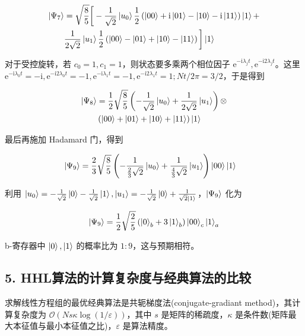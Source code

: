 \documentclass[aps,prl,twocolumn,groupedaddress]{revtex4-2}
\begin{document}
$$
\begin{aligned}
\ket{\Psi_7}
&=\sqrt{\frac{8 }{5 } }\bigg[-\frac{1 }{\sqrt{2} } \ket{u_0}\frac{1 }{2 } \left(\ket{00}+\mathrm{i}\ket{01}-\ket{10}-\mathrm{i}\ket{11} \right)\ket{1} + \\
&\frac{1 }{2\sqrt{2} } \ket{u_1}\frac{1 }{2 } \left(\ket{00}-\ket{01}+\ket{10}-\ket{11} \right) \bigg]\ket{1}
\end{aligned}
$$

对于受控旋转，若 $c_0=1,c_1=1$，则状态要多乘两个相位因子 $\mathrm{e}^{-\mathrm{i}\lambda_j t},\mathrm{e}^{-\mathrm{i}2\lambda_j t}$。这里 $\mathrm{e}^{-\mathrm{i}\lambda_0 t}=-\mathrm{i},\mathrm{e}^{-\mathrm{i}2\lambda_0 t}=-1,\mathrm{e}^{-\mathrm{i}\lambda_1 t}=-1,\mathrm{e}^{-\mathrm{i}2\lambda_1 t}=1;Nt/2\pi=3/2$，于是得到

$$
\begin{aligned}
\ket{\Psi_8}
&=\frac{1 }{2 } \sqrt{\frac{8 }{5 } }\left(-\frac{1 }{\sqrt{2} } \ket{u_0} + \frac{1 }{2\sqrt{2} } \ket{u_1} \right)\otimes \\
&\left(\ket{00}+\ket{01}+\ket{10}+\ket{11} \right)\ket{1}
\end{aligned}
$$

最后再施加 Hadamard 门，得到

$$
\begin{aligned}
\ket{\Psi_9}
&=\frac{2 }{3 } \sqrt{\frac{8 }{5 } }\left(-\frac{1 }{\frac{2 }{3 } \sqrt{2} } \ket{u_0} + \frac{1 }{\frac{4 }{3 } \sqrt{2} } \ket{u_1} \right)\ket{00}\ket{1}
\end{aligned}
$$

利用 $\ket{u_0}=-\frac{1 }{\sqrt{2} }\ket{0}-\frac{1 }{\sqrt{2} } \ket{1},\ket{u_1}=-\frac{1 }{\sqrt{2} } \ket{0} + \frac{1 }{\sqrt{2} \ket{1} } $，$\ket{\Psi_9}$ 化为

$$
\ket{\Psi_9}
=\frac{1 }{2 } \sqrt{\frac{2 }{5 } }\left(\ket{0}_b+3\ket{1}_b \right)\ket{00}_c\ket{1}_a
$$

b-寄存器中 $\ket{0},\ket{1}$ 的概率比为 $1:9$，这与预期相符。

\subsection{5. HHL算法的计算复杂度与经典算法的比较}

求解线性方程组的最优经典算法是共轭梯度法(conjugate-gradiant method)，其计算复杂度为 $\mathcal{O}(Ns\kappa \log(1/\varepsilon))$，其中 $s$ 是矩阵的稀疏度，$\kappa$ 是条件数(矩阵最大本征值与最小本征值之比)，$\varepsilon$ 是算法精度。
\end{document}

